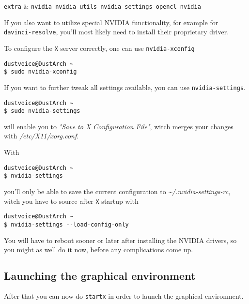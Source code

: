 \documentclass[10pt]{dustdoc}
\begin{document}
\begin{packagetable}
    \texttt{extra} & \texttt{nvidia nvidia-utils nvidia-settings opencl-nvidia} \\
\end{packagetable}

If you also want to utilize special NVIDIA functionality, for example for \texttt{davinci-resolve}, you’ll most likely need to install their proprietary driver.

To configure the \texttt{X} server correctly, one can use \texttt{nvidia-xconfig}

\begin{verbatim}
dustvoice@DustArch ~
$ sudo nvidia-xconfig
\end{verbatim}

If you want to further tweak all settings available, you can use \texttt{nvidia-settings}.

\begin{verbatim}
dustvoice@DustArch ~
$ sudo nvidia-settings
\end{verbatim}

\noindent
will enable you to \emph{"Save to X Configuration File"}, witch merges your changes with \textit{/etc/X11/xorg.conf}.

With

\begin{verbatim}
dustvoice@DustArch ~
$ nvidia-settings
\end{verbatim}

\noindent
you’ll only be able to save the current configuration to \textit{\~{}/.nvidia-settings-rc}, witch you have to source after \texttt{X} startup with

\begin{verbatim}
dustvoice@DustArch ~
$ nvidia-settings --load-config-only
\end{verbatim}

\begin{NOTE}
    You will have to reboot sooner or later after installing the NVIDIA drivers, so you might as well do it now, before any complications come up.
\end{NOTE}

\subsection{Launching the graphical environment}
\label{sec:launching-the-graphical-environment}

After that you can now do \texttt{startx} in order to launch the graphical environment.
\end{document}
